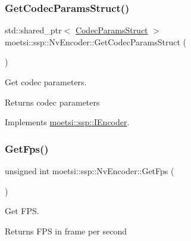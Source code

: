 \mbox{\label{classmoetsi_1_1ssp_1_1NvEncoder_aa6229a43b12d2f27e27f518fc2229b61}} 
\subsubsection{\texorpdfstring{Get\+Codec\+Params\+Struct()}{GetCodecParamsStruct()}}
{\footnotesize\ttfamily std\+::shared\+\_\+ptr$<$ \hyperlink{structmoetsi_1_1ssp_1_1CodecParamsStruct}{Codec\+Params\+Struct} $>$ moetsi\+::ssp\+::\+Nv\+Encoder\+::\+Get\+Codec\+Params\+Struct (\begin{DoxyParamCaption}{ }\end{DoxyParamCaption})\hspace{0.3cm}{\ttfamily [virtual]}}



Get codec parameters. 

\begin{DoxyReturn}{Returns}
codec parameters 
\end{DoxyReturn}


Implements \hyperlink{classmoetsi_1_1ssp_1_1IEncoder_ad5179efaa4c74207766dd64f46f4059a}{moetsi\+::ssp\+::\+I\+Encoder}.

\mbox{\label{classmoetsi_1_1ssp_1_1NvEncoder_ab94b826f2aef05afad376132743001d9}} 
\subsubsection{\texorpdfstring{Get\+Fps()}{GetFps()}}
{\footnotesize\ttfamily unsigned int moetsi\+::ssp\+::\+Nv\+Encoder\+::\+Get\+Fps (\begin{DoxyParamCaption}{ }\end{DoxyParamCaption})\hspace{0.3cm}{\ttfamily [virtual]}}



Get F\+PS. 

\begin{DoxyReturn}{Returns}
F\+PS in frame per second 
\end{DoxyReturn}


